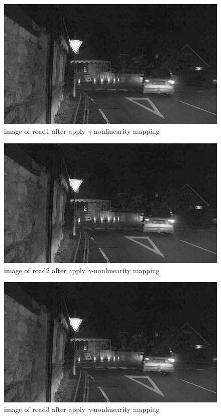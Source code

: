 \documentclass[
	12pt, %
]{fphw}
\begin{document}
\begin{figure}[H]
 
	\centering
	\includegraphics[width=1\columnwidth]{T2/result/I1_gama.jpg} 
	\caption{image of road1 after apply $\gamma$-nonlinearity mapping}
	\label{fig22}
\end{figure}
\begin{figure}[H]
 
	\centering
	\includegraphics[width=1\columnwidth]{T2/result/I2_gama.jpg} 
	\caption{image of road2 after apply $\gamma$-nonlinearity mapping}
	\label{fig23}
\end{figure}
\begin{figure}[H]
 
	\centering
	\includegraphics[width=1\columnwidth]{T2/result/I3_gama.jpg} 
	\caption{image of road3 after apply $\gamma$-nonlinearity mapping}
	\label{fig24}
\end{figure}
\end{document}
